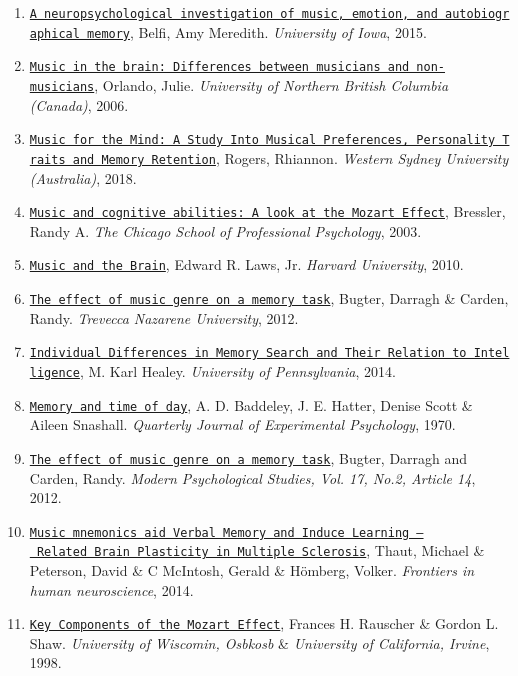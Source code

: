\documentclass[]{article}
\providecommand{\tightlist}{%
  \setlength{\itemsep}{0pt}\setlength{\parskip}{0pt}}
\begin{document}
\begin{enumerate}
\def\labelenumi{(\arabic{enumi})}
\tightlist
\item
  \href{https://search.proquest.com/docview/1701283142?pq-origsite=summon\&accountid=14512}{\texttt{A\ neuropsychological\ investigation\ of\ music,\ emotion,\ and\ autobiographical\ memory}},
  Belfi, Amy Meredith. \emph{University of Iowa}, 2015.
\item
  \href{https://search.proquest.com/docview/304910597?pq-origsite=summon\&accountid=14512}{\texttt{Music\ in\ the\ brain:\ Differences\ between\ musicians\ and\ non-musicians}},
  Orlando, Julie. \emph{University of Northern British Columbia
  (Canada)}, 2006.
\item
  \href{https://search.proquest.com/docview/2083960675?accountid=14512}{\texttt{Music\ for\ the\ Mind:\ A\ Study\ Into\ Musical\ Preferences,\ Personality\ Traits\ and\ Memory\ Retention}},
  Rogers, Rhiannon. \emph{Western Sydney University (Australia)}, 2018.
\item
  \href{https://search.proquest.com/docview/305228684?pq-origsite=summon\&accountid=14512}{\texttt{Music\ and\ cognitive\ abilities:\ A\ look\ at\ the\ Mozart\ Effect}},
  Bressler, Randy A. \emph{The Chicago School of Professional
  Psychology}, 2003.
\item
  \href{https://www.sciencedirect.com/science/article/pii/S1878875010001129}{\texttt{Music\ and\ the\ Brain}},
  Edward R. Laws, Jr. \emph{Harvard University}, 2010.
\item
  \href{https://scholar.utc.edu/cgi/viewcontent.cgi?article=1214\&context=mps}{\texttt{The\ effect\ of\ music\ genre\ on\ a\ memory\ task}},
  Bugter, Darragh \& Carden, Randy. \emph{Trevecca Nazarene University},
  2012.
\item
  \href{http://memory.psych.upenn.edu/files/pubs/HealEtal14.pdf}{\texttt{Individual\ Differences\ in\ Memory\ Search\ and\ Their\ Relation\ to\ Intelligence}},
  M. Karl Healey. \emph{University of Pennsylvania}, 2014.
\item
  \href{https://journals.sagepub.com/doi/10.1080/14640747008401939}{\texttt{Memory\ and\ time\ of\ day}},
  A. D. Baddeley, J. E. Hatter, Denise Scott \& Aileen Snashall.
  \emph{Quarterly Journal of Experimental Psychology}, 1970.
\item
  \href{https://scholar.utc.edu/mps/vol17/iss2/14}{\texttt{The\ effect\ of\ music\ genre\ on\ a\ memory\ task}},
  Bugter, Darragh and Carden, Randy. \emph{Modern Psychological Studies,
  Vol. 17, No.2, Article 14}, 2012.
\item
  \href{https://www.frontiersin.org/articles/10.3389/fnhum.2014.00395/full}{\texttt{Music\ mnemonics\ aid\ Verbal\ Memory\ and\ Induce\ Learning\ –\ Related\ Brain\ Plasticity\ in\ Multiple\ Sclerosis}},
  Thaut, Michael \& Peterson, David \& C McIntosh, Gerald \& Hömberg,
  Volker. \emph{Frontiers in human neuroscience}, 2014.
\item
  \href{https://journals.sagepub.com/doi/10.2466/pms.1998.86.3.835}{\texttt{Key\ Components\ of\ the\ Mozart\ Effect}},
  Frances H. Rauscher \& Gordon L. Shaw. \emph{University of Wiscomin,
  Osbkosb} \& \emph{University of California, Irvine}, 1998.
\end{enumerate}
\end{document}
